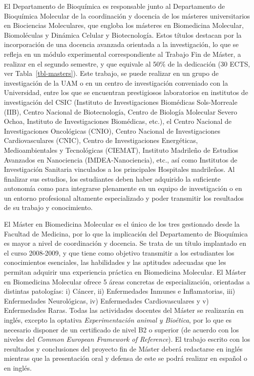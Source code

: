 \documentclass[
  11pt,
  a4paper,
  twoside]{scrreprt}
\begin{document}
El Departamento de Bioquímica es responsable junto al Departamento de
Bioquímica Molecular de la coordinación y docencia de los másteres
universitarios en Biociencias Moleculares, que engloba los másteres en
Biomedicina Molecular, Biomoléculas y Dinámica Celular y Biotecnología.
Estos títulos destacan por la incorporación de una docencia avanzada
orientada a la investigación, lo que se refleja en un módulo
experimental correspondiente al Trabajo Fin de Máster, a realizar en el
segundo semestre, y que equivale al 50\% de la dedicación (30 ECTS, ver
Tabla~\ref{tbl-masters}). Este trabajo, se puede realizar en un grupo de
investigación de la UAM o en un centro de investigación conveniado con
la Universidad, entre los que se encuentran prestigiosos laboratorios en
institutos de investigación del CSIC (Instituto de Investigaciones
Biomédicas Sols-Morreale (IIB), Centro Nacional de Biotecnología, Centro
de Biología Molecular Severo Ochoa, Instituto de Investigaciones
Biomédicas, etc.), el Centro Nacional de Investigaciones Oncológicas
(CNIO), Centro Nacional de Investigaciones Cardiovasculares (CNIC),
Centro de Investigaciones Energéticas, Medioambientales y Tecnológicas
(CIEMAT), Instituto Madrileño de Estudios Avanzados en Nanociencia
(IMDEA-Nanociencia), etc., así como Institutos de Investigación
Sanitaria vinculados a los principales Hospitales madrileños. Al
finalizar sus estudios, los estudiantes deben haber adquirido la
suficiente autonomía como para integrarse plenamente en un equipo de
investigación o en un entorno profesional altamente especializado y
poder transmitir los resultados de su trabajo y conocimiento.

El Máster en Biomedicina Molecular es el único de los tres gestionado
desde la Facultad de Medicina, por lo que la implicación del
Departamento de Bioquímica es mayor a nivel de coordinación y docencia.
Se trata de un título implantado en el curso 2008-2009, y que tiene como
objetivo transmitir a los estudiantes los conocimientos esenciales, las
habilidades y las aptitudes adecuadas que les permitan adquirir una
experiencia práctica en Biomedicina Molecular. El Máster en Biomedicina
Molecular ofrece 5 áreas concretas de especialización, orientadas a
distintas patologías: i) Cáncer, ii) Enfermedades Inmunes e
Inflamatorias, iii) Enfermedades Neurológicas, iv) Enfermedades
Cardiovasculares y v) Enfermedades Raras. Todas las actividades docentes
del Máster se realizarán en inglés, excepto la optativa
\emph{Experimentación animal y Bioética}, por lo que es necesario
disponer de un certificado de nivel B2 o superior (de acuerdo con los
niveles del \emph{Common European Framework of Reference}). El trabajo
escrito con los resultados y conclusiones del proyecto fin de Máster
deberá redactarse en inglés mientras que la presentación oral y defensa
de este se podrá realizar en español o en inglés.
\end{document}
